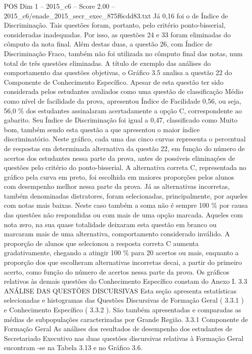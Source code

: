 \begin{textsample}{POS Dim 1 – 2015\_c6 – Score 2.00 – 2015\_c6/enade\_2015\_secr\_exec\_875f6cdd83.txt}
Já 0,16 foi o de Índice de Discriminação.
Tais questões foram, portanto, pelo critério ponto-bisserial, consideradas inadequadas.
Por isso, as questões 24 e 33 foram eliminadas do cômputo da nota final.
Além destas duas, a questão 26, com Índice de Discriminação Fraco, também não foi utilizada no cômputo final das notas, num total de três questões eliminadas.
A título de exemplo das análises do comportamento das questões objetivas, o Gráfico 3.5 analisa a questão 22 do Componente de Conhecimento Específico.
Apesar de esta questão ter sido considerada pelos estudantes avaliados como uma questão de classificação Médio como nível de facilidade da prova, apresentou Índice de Facilidade 0,56, ou seja, 56,0 \% dos estudantes assinalaram acertadamente a opção C, correspondente ao gabarito.
Seu Índice de Discriminação foi igual a 0,47, classificado como Muito bom, também sendo esta questão a que apresentou o maior índice discriminatório.
Neste gráfico, cada uma das cinco curvas representa o percentual de respostas em determinada alternativa da questão 22, em função do número de acertos dos estudantes nessa parte da prova, antes de possíveis eliminações de questões pelo critério do ponto-bisserial.
A alternativa correta C, representada no gráfico pela curva em preto, foi escolhida em maiores proporções pelos alunos com desempenho melhor nessa parte da prova.
Já as alternativas incorretas, também denominadas distratores, foram selecionadas, principalmente, por aqueles com notas mais baixas.
Neste caso também a soma não é sempre 100 \% por causa das questões não respondidas ou com mais de uma opção marcada.
Aqueles com nota zero, na sua quase totalidade deixaram esta questão em branco ou marcaram mais de uma alternativa, comportamento considerado inválido.
A proporção de alunos que selecionou a resposta correta C aumenta gradativamente, chegando a atingir 100 \% para 20 acertos ou mais, enquanto a proporção dos que escolheram alternativas incorretas decai, a partir do primeiro acerto, como função do número de acertos nessa parte da prova.
Os gráficos relativos às demais questões do Conhecimento Específico constam do Anexo I. 3.3 ANÁLISE DAS QUESTÕES DISCURSIVAS Esta seção apresenta estatísticas selecionadas e histogramas das Questões Discursivas de Formação Geral ( 3.3.1 ) e Conhecimento Específico ( 3.3.2 ).
São também apresentadas e comparadas as médias de subpopulações caracterizadas por Grande Região. 3.3.1 Componente de Formação Geral As análises dos resultados de desempenho dos estudantes de Secretariado Executivo nas duas questões discursivas relativas à Formação Geral encontram -se na Tabela 3.13 e no Gráfico 3.6.

\end{textsample}

